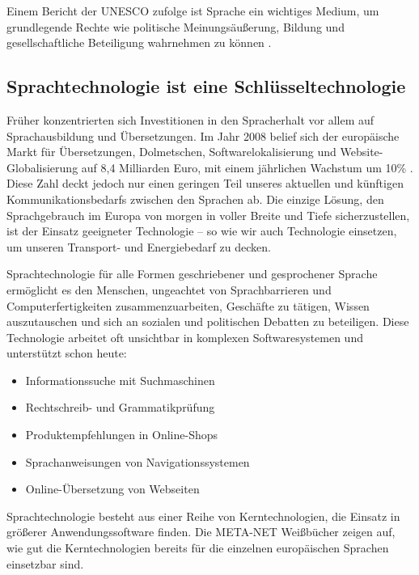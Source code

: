 \begin{multicols}{2}
Einem Bericht der UNESCO zufolge ist Sprache ein wichtiges Medium, um grundlegende Rechte wie politische Meinungsäußerung, Bildung und gesellschaftliche Beteiligung wahrnehmen zu können \cite{Unesco1}.

\subsection{Sprachtechnologie ist eine Schlüsseltechnologie}

Früher konzentrierten sich Investitionen in den Sprach\-er\-halt vor allem auf Sprachausbildung und Übersetzungen. Im Jahr 2008 belief sich der europäische Markt für Übersetzungen, Dolmetschen, Softwarelokalisierung und Website-Globalisierung auf 8,4 Milliarden Euro, mit einem jährlichen Wachstum um 10\%   \cite{EC3}. Diese Zahl deckt jedoch nur einen geringen Teil unseres aktuellen und künftigen Kommunikationsbedarfs zwischen den Sprachen ab. Die einzige Lösung, den Sprachgebrauch im Europa von morgen in voller Breite und Tiefe sicherzustellen, ist der Einsatz geeigneter Tech\-no\-lo\-gie -- so wie wir auch Technologie einsetzen, um unseren Transport- und Energiebedarf zu decken.

Sprachtechnologie für alle Formen geschriebener und gesprochener Sprache ermöglicht es den Menschen, ungeachtet von Sprachbarrieren und Computerfertigkeiten zusammenzuarbeiten, Geschäfte zu tätigen, Wissen auszutauschen und sich an sozialen und politischen Debatten zu beteiligen. Diese Technologie arbeitet oft unsichtbar in komplexen Softwaresystemen und unterstützt schon heute:

\begin{itemize}
\item Informationssuche mit Suchmaschinen
\item Rechtschreib- und Grammatikprüfung
\item Produktempfehlungen in Online-Shops
\item Sprachanweisungen von Na\-vi\-ga\-tions\-sys\-te\-men
\item Online-Übersetzung von Webseiten 
\end{itemize}

Sprachtechnologie besteht aus einer Reihe von Kerntechnologien, die Einsatz in größerer Anwendungssoftware finden. Die META-NET Weißbücher zeigen auf, wie gut die Kerntechnologien bereits für die einzelnen europäischen Sprachen einsetzbar sind. 



\end{multicols}
